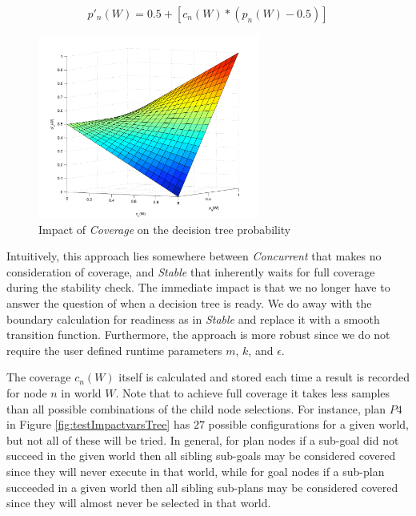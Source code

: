 \documentclass[a4paper]{article}
\newcommand{\cc}{\emph{Concurrent}\xspace}
\newcommand{\st}{\emph{Stable}\xspace}
\newcommand{\cov}{\emph{Coverage}\xspace}
\newcommand{\dt}{{decision tree}\xspace}
\begin{document}
\begin{equation}
\label{eqn:coverage}   
p'_n(W)= 0.5 + \left[  c_n(W) *  \left( p_n(W) - 0.5 \right)  \right]
\end{equation}

\begin{figure}[ht]
   \centering
   \includegraphics[width=0.65\textwidth]{coverage-surface.pdf}
   \caption{Impact of \cov on the \dt probability}
   \label{fig:coverage-surface}
\end{figure}

Intuitively, this approach lies somewhere between \cc that makes no consideration of coverage, and \st that inherently waits for full coverage during the stability check. The immediate impact is that we no longer have to answer the question of when a \dt is ready. We do away with the boundary calculation for readiness as in \st and replace it with a smooth transition function. Furthermore, the approach is more robust since we do not require the user defined runtime parameters  $m$, $k$, and $\epsilon$.

The coverage $c_n(W)$ itself is calculated and stored each time a result is recorded for node $n$ in world $W$. Note that to achieve full coverage it takes less samples than all possible combinations of the child node selections. For instance, plan $P4$ in Figure \ref{fig:testImpactvarsTree} has $27$ possible configurations for a given world, but not all of these will be tried. In general, for plan nodes if a sub-goal did not succeed in the given world then all sibling sub-goals may be considered covered since they will never execute in that world, while for goal nodes if a sub-plan succeeded in a given world then all sibling sub-plans may be considered covered since they will almost never be selected in that world.
                     
\end{document}
